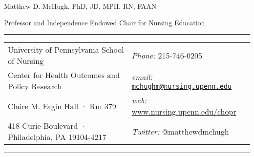\documentclass[10pt,]{article}
\begin{document}
\raggedright

\centerline{\LARGE \sc Matthew D. McHugh, {\large PhD, JD, MPH, RN, FAAN}}

\vspace{2 mm}

\centerline{\large \sc Professor and Independence Endowed Chair for Nursing Education}

\vspace{2 mm}

\hrule
\begin{tabular}{@{}p{3.5in}p{4in}}
University of Pennsylvania School of Nursing  & \hspace{1in} {\textit {Phone:}}  215-746-0205 \\  
Center for Health Outcomes and Policy Research & \hspace{1in} {\textit {email:}}  {\ttfamily \href{mailto:mchughm@nursing.upenn.edu}{\nolinkurl{mchughm@nursing.upenn.edu}}} \\              
Claire M. Fagin Hall · Rm 379  & \hspace{1in} {\textit {web:}} \href{https://www.nursing.upenn.edu/chopr}{\ttfamily www.nursing.upenn.edu/chopr}\\       
418 Curie Boulevard · Philadelphia, PA 19104-4217  & \hspace{1in} {\textit {Twitter:}} {\ttfamily @matthewdmchugh}\\     
\end{tabular}

\vspace{2 mm}

\hrule
\end{document}
